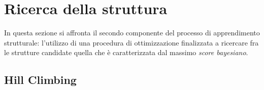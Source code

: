 \section{Ricerca della struttura}\label{sec:structurallearning-search}
In questa sezione si affronta il secondo componente del processo di apprendimento strutturale: l'utilizzo di una procedura di ottimizzazione finalizzata a ricercare fra le strutture candidate quella che è caratterizzata dal massimo \emph{score bayesiano}.

\subsection{Hill Climbing}\label{sec:structurallearning-hc}
\omissis{}






